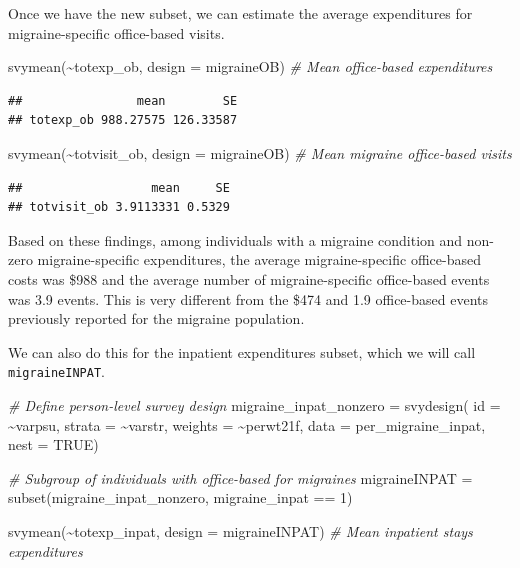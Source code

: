 \documentclass[
]{book}
\newenvironment{Shaded}{\begin{snugshade}}{\end{snugshade}}
\newcommand{\AttributeTok}[1]{\textcolor[rgb]{0.77,0.63,0.00}{#1}}
\newcommand{\CommentTok}[1]{\textcolor[rgb]{0.56,0.35,0.01}{\textit{#1}}}
\newcommand{\ConstantTok}[1]{\textcolor[rgb]{0.00,0.00,0.00}{#1}}
\newcommand{\DecValTok}[1]{\textcolor[rgb]{0.00,0.00,0.81}{#1}}
\newcommand{\FunctionTok}[1]{\textcolor[rgb]{0.00,0.00,0.00}{#1}}
\newcommand{\NormalTok}[1]{#1}
\newcommand{\OtherTok}[1]{\textcolor[rgb]{0.56,0.35,0.01}{#1}}
\newcommand{\SpecialCharTok}[1]{\textcolor[rgb]{0.00,0.00,0.00}{#1}}
\begin{document}
Once we have the new subset, we can estimate the average expenditures for migraine-specific office-based visits.

\begin{Shaded}
\begin{Highlighting}[]
\FunctionTok{svymean}\NormalTok{(}\SpecialCharTok{\textasciitilde{}}\NormalTok{totexp\_ob, }\AttributeTok{design =}\NormalTok{ migraineOB) }\CommentTok{\# Mean office{-}based expenditures}
\end{Highlighting}
\end{Shaded}

\begin{verbatim}
##                mean        SE
## totexp_ob 988.27575 126.33587
\end{verbatim}

\begin{Shaded}
\begin{Highlighting}[]
\FunctionTok{svymean}\NormalTok{(}\SpecialCharTok{\textasciitilde{}}\NormalTok{totvisit\_ob, }\AttributeTok{design =}\NormalTok{ migraineOB) }\CommentTok{\# Mean migraine office{-}based visits}
\end{Highlighting}
\end{Shaded}

\begin{verbatim}
##                  mean     SE
## totvisit_ob 3.9113331 0.5329
\end{verbatim}

Based on these findings, among individuals with a migraine condition and non-zero migraine-specific expenditures, the average migraine-specific office-based costs was \$988 and the average number of migraine-specific office-based events was 3.9 events. This is very different from the \$474 and 1.9 office-based events previously reported for the migraine population.

We can also do this for the inpatient expenditures subset, which we will call \texttt{migraineINPAT}.

\begin{Shaded}
\begin{Highlighting}[]
\CommentTok{\# Define person{-}level survey design}
\NormalTok{migraine\_inpat\_nonzero }\OtherTok{=} \FunctionTok{svydesign}\NormalTok{(}
  \AttributeTok{id =} \SpecialCharTok{\textasciitilde{}}\NormalTok{varpsu, }
  \AttributeTok{strata =} \SpecialCharTok{\textasciitilde{}}\NormalTok{varstr,}
  \AttributeTok{weights =} \SpecialCharTok{\textasciitilde{}}\NormalTok{perwt21f,}
  \AttributeTok{data =}\NormalTok{ per\_migraine\_inpat,}
  \AttributeTok{nest =} \ConstantTok{TRUE}\NormalTok{)}
  
\CommentTok{\# Subgroup of individuals with office{-}based for migraines}
\NormalTok{migraineINPAT }\OtherTok{=} \FunctionTok{subset}\NormalTok{(migraine\_inpat\_nonzero, migraine\_inpat }\SpecialCharTok{==} \DecValTok{1}\NormalTok{)}

\FunctionTok{svymean}\NormalTok{(}\SpecialCharTok{\textasciitilde{}}\NormalTok{totexp\_inpat, }\AttributeTok{design =}\NormalTok{ migraineINPAT) }\CommentTok{\# Mean inpatient stays expenditures}
\end{Highlighting}
\end{Shaded}
\end{document}
